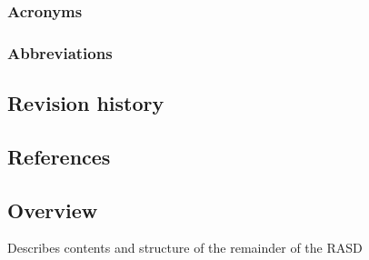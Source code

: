 \subsubsection{Acronyms}
\label{subsect:acronyms}

\subsubsection{Abbreviations}
\label{subsect:abbreviations}

\subsection{Revision history}
\label{subsect:revisionhistory}

\subsection{References}
\label{subsect:references}

\subsection{Overview}
\label{subsect:overview}

Describes contents and structure of the remainder of the RASD